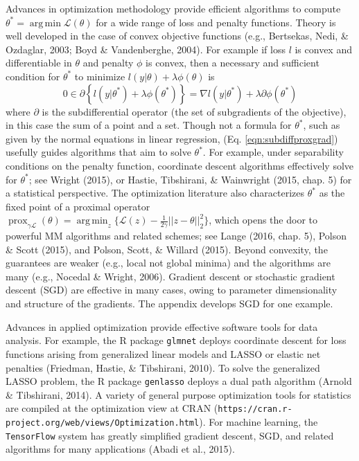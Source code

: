 \documentclass[12pt]{TD-CJS}
\newcommand{\prox}{ \mathop{\mathrm{prox}} }
\DeclareMathOperator*{\argmin}{arg\,min}
\begin{document}
Advances in optimization methodology provide efficient algorithms
to compute $\theta^* = \argmin \mathcal{L}(\theta)$  for a wide range of  loss and penalty functions. 
Theory is well developed in the case of convex objective functions (e.g., Bertsekas, Nedi, \& Ozdaglar, 2003; Boyd \& Vandenberghe, 2004). For example
if loss $l$ is convex and differentiable in $\theta$ and penalty $\phi$ is convex, then 
a necessary and sufficient condition for $\theta^*$ to minimize $ l(y|\theta) + \lambda\phi(\theta)$  is 
\begin{equation}
\label{eqn:subdiffproxgrad}
0 \in \partial \left\{ l(y|\theta^*) + \lambda\phi(\theta^*)\right\} = \nabla l(y|\theta^*) + \lambda\partial \phi(\theta^*) 
\end{equation}
where $\partial$ is the subdifferential operator (the set of subgradients of the objective), in this case
the sum of a point and a set.   Though not a formula for $\theta^*$, such as given by the normal equations in linear regression, 
(Eq. \ref{eqn:subdiffproxgrad}) usefully guides algorithms that aim to solve $\theta^*$.   
For example, under separability conditions on the penalty function, coordinate descent algorithms effectively solve for $\theta^*$;
see Wright (2015), or  Hastie, Tibshirani, \& Wainwright  (2015, chap. 5) for a statistical perspective.
The optimization literature also characterizes $\theta^*$ as the fixed point of a proximal operator
$\prox_{\gamma \mathcal{L}}(\theta) = \argmin_z \{ \mathcal{L}(z) - \frac{1}{2\gamma} || z - \theta||_2^2  \}$, 
which opens the door to powerful MM algorithms and related schemes; 
 see Lange (2016, chap. 5), Polson \& Scott (2015), and Polson, Scott, \& Willard  (2015).  
Beyond convexity, the guarantees are weaker (e.g., local
not global minima) and the algorithms are many (e.g., Nocedal \& Wright, 2006).  Gradient descent
or stochastic gradient descent (SGD) are effective in many cases, owing to parameter 
dimensionality and structure of the gradients.  The appendix develops SGD for one example.

Advances in applied optimization provide effective software tools for data analysis. For example, the R package
\verb+glmnet+ deploys coordinate descent for loss functions arising from generalized linear models and LASSO or 
elastic net penalties (Friedman, Hastie, \& Tibshirani, 2010). To solve the generalized LASSO problem, the R package 
\verb+genlasso+  deploys a dual path algorithm (Arnold \& Tibshirani, 2014).  A variety of general 
purpose optimization tools for statistics are compiled at the optimization view at CRAN 
(\verb+https://cran.r-project.org/web/views/Optimization.html+). For machine learning, the \verb+TensorFlow+ system has greatly simplified 
gradient descent, SGD, and related algorithms for many applications (Abadi et al., 2015).  
\end{document}
